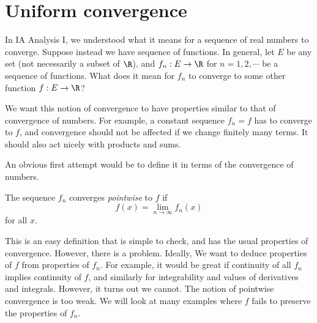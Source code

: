 \documentclass[a4paper]{article}
\begin{document}
\section{Uniform convergence}
In IA Analysis I, we understood what it means for a sequence of real numbers to converge. Suppose instead we have sequence of functions. In general, let $E$ be any set (not necessarily a subset of $\R$), and $f_n: E\to \R$ for $n = 1, 2, \cdots$ be a sequence of functions. What does it mean for $f_n$ to converge to some other function $f: E \to \R$?

We want this notion of convergence to have properties similar to that of convergence of numbers. For example, a constant sequence $f_n = f$ has to converge to $f$, and convergence should not be affected if we change finitely many terms. It should also act nicely with products and sums.

An obvious first attempt would be to define it in terms of the convergence of numbers.
\begin{defi}
  The sequence $f_n$ converges \emph{pointwise} to $f$ if
  \[
    f(x) = \lim_{n\to \infty} f_n(x)
  \]
  for all $x$.
\end{defi}
This is an easy definition that is simple to check, and has the usual properties of convergence. However, there is a problem. Ideally, We want to deduce properties of $f$ from properties of $f_n$. For example, it would be great if continuity of all $f_n$ implies continuity of $f$, and similarly for integrability and values of derivatives and integrals. However, it turns out we cannot. The notion of pointwise convergence is too weak. We will look at many examples where $f$ fails to preserve the properties of $f_n$.
\end{document}
